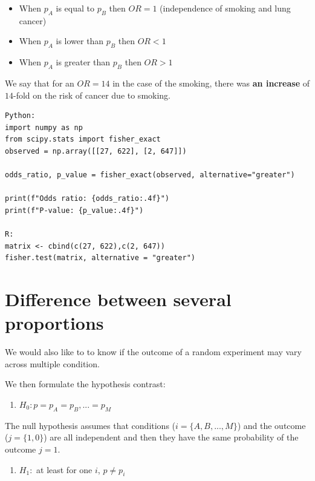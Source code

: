 \documentclass[
]{book}
\providecommand{\tightlist}{%
  \setlength{\itemsep}{0pt}\setlength{\parskip}{0pt}}
\begin{document}
\begin{itemize}
\tightlist
\item
  When \(p_A\) is equal to \(p_B\) then \(OR=1\) (independence of smoking and lung cancer)
\item
  When \(p_A\) is lower than \(p_B\) then \(OR<1\)
\item
  When \(p_A\) is greater than \(p_B\) then \(OR>1\)
\end{itemize}

We say that for an \(OR=14\) in the case of the smoking, there was \textbf{an increase} of \(14\)-fold on the risk of cancer due to smoking.

\begin{verbatim}
Python:
import numpy as np
from scipy.stats import fisher_exact
observed = np.array([[27, 622], [2, 647]])

odds_ratio, p_value = fisher_exact(observed, alternative="greater")

print(f"Odds ratio: {odds_ratio:.4f}")
print(f"P-value: {p_value:.4f}")

R:
matrix <- cbind(c(27, 622),c(2, 647))
fisher.test(matrix, alternative = "greater")
\end{verbatim}

\hypertarget{difference-between-several-proportions}{%
\section{Difference between several proportions}\label{difference-between-several-proportions}}

We would also like to to know if the outcome of a random experiment may vary across multiple condition.

We then formulate the hypothesis contrast:

\begin{enumerate}
\def\labelenumi{\alph{enumi}.}
\tightlist
\item
  \(H_0: p=p_A=p_B,...=p_M\)
\end{enumerate}

The null hypothesis assumes that conditions (\(i=\{A,B,... ,M\}\)) and the outcome (\(j=\{1,0\}\)) are all independent and then they have the same probability of the outcome \(j=1\).

\begin{enumerate}
\def\labelenumi{\alph{enumi}.}
\setcounter{enumi}{1}
\tightlist
\item
  \(H_1:\) at least for one \(i\), \(p\neq p_i\)
\end{enumerate}
\end{document}
